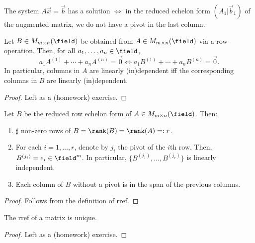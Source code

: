 \begin{corollary}
    The system $A \vec{x} = \vec{b}$ has a solution $\iff$ in the reduced echelon form $(A_1\vert \vec{b}_1)$ of the augmented matrix, we do not have a pivot in the last column.
\end{corollary}

\begin{lemma}\label{lemma:elementarypreservationofdependence}
    Let $B \in M_{m \times n}(\field)$ be obtained from $A \in M_{m \times n}(\field)$ via a row operation. Then, for all $a_1, \dots, a_n \in \field$, $$a_1 A^{(1)} + \cdots + a_n A^{(n)} = \vec{0} \iff a_1 B^{(1)} + \cdots + a_n B^{(n)} = \vec{0}.$$
    In particular, columns in $A$ are linearly (in)dependent iff the corresponding columns in $B$ are linearly (in)dependent.
\end{lemma}
\begin{proof}
    Left as a (homework) exercise.
\end{proof}

\begin{lemma}
    Let $B$ be the reduced row echelon form of $A \in M_{m \times n}(\field)$. Then:
    \begin{enumerate}
        \item $\sharp$ non-zero rows of $B= \rank(B) = \rank(A) =: r$.
        \item For each $i = 1, \dots, r$, denote by $j_i$ the pivot of the $i$th row. Then, $B^{(j_i)} = e_i \in \field^m$. In particular, $\{B^{(j_1)}, \dots, B^{(j_r)}\}$ is linearly independent.
        \item Each column of $B$ without a pivot is in the span of the previous columns.
    \end{enumerate}
\end{lemma}
\begin{proof}
   Follows from the definition of rref.
\end{proof}

\begin{corollary}
    The rref of a matrix is unique.
\end{corollary}
\begin{proof}
    Left as a (homework) exercise.
\end{proof}
